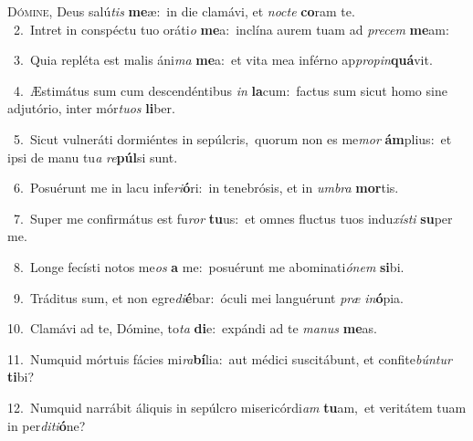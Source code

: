 \lettrine{\initial\textcolor{\initialcolor}{D}}{ómine,} Deus salú\textit{tis} \textbf{me}\-æ:~\star in die clamávi, et \textit{noc}\-\textit{te} \textbf{co}\-ram te.\\
{\numbfont\textcolor{\numbcolor}{~2.}}~Intret in conspéctu tuo oráti\textit{o} \textbf{me}\-a:~\star inclína aurem tuam ad \textit{pre}\-\textit{cem} \textbf{me}\-am:\par
{\numbfont\textcolor{\numbcolor}{~3.}}~Quia repléta est malis áni\textit{ma} \textbf{me}\-a:~\star et vita mea inférno ap\-\textit{pro}\-\textit{pin}\textbf{quá}vit.\par
{\numbfont\textcolor{\numbcolor}{~4.}}~Æstimátus sum cum descendéntibus \textit{in} \textbf{la}\-cum:~\star factus sum sicut homo sine adjutório, inter mór\-\textit{tu}\-\textit{os} \textbf{li}\-ber.\par
{\numbfont\textcolor{\numbcolor}{~5.}}~Sicut vulneráti dormiéntes in sepúlcris,~\dagger quorum non es me\textit{mor} \textbf{ám}\-plius:~\star et ipsi de manu tu\textit{a} \textit{re}\-\textbf{púl}si sunt.\par
{\numbfont\textcolor{\numbcolor}{~6.}}~Posuérunt me in lacu infe\-\textit{ri}\-\textbf{ó}ri:~\star in tenebrósis, et in \textit{um}\-\textit{bra} \textbf{mor}\-tis.\par
{\numbfont\textcolor{\numbcolor}{~7.}}~Super me confirmátus est fu\textit{ror} \textbf{tu}\-us:~\star et omnes fluctus tuos indu\-\textit{xís}\-\textit{ti} \textbf{su}\-per me.\par
{\numbfont\textcolor{\numbcolor}{~8.}}~Longe fecísti notos me\textit{os} \textbf{a} me:~\star posuérunt me abominati\-\textit{ó}\-\textit{nem} \textbf{si}\-bi.\par
{\numbfont\textcolor{\numbcolor}{~9.}}~Tráditus sum, et non egre\-\textit{di}\-\textbf{é}bar:~\star óculi mei languérunt \textit{præ} \textit{in}\-\textbf{ó}pia.\par
{\numbfont\textcolor{\numbcolor}{10.}}~Clamávi ad te, Dómine, to\textit{ta} \textbf{di}\-e:~\star expándi ad te \textit{ma}\-\textit{nus} \textbf{me}\-as.\par
{\numbfont\textcolor{\numbcolor}{11.}}~Numquid mórtuis fácies mi\-\textit{ra}\-\textbf{bí}lia:~\star aut médici suscitábunt, et confite\-\textit{bún}\-\textit{tur} \textbf{ti}\-bi?\par
{\numbfont\textcolor{\numbcolor}{12.}}~Numquid narrábit áliquis in sepúlcro misericórdi\textit{am} \textbf{tu}\-am,~\star et veritátem tuam in per\-\textit{di}\-\textit{ti}\textbf{ó}ne?\par
